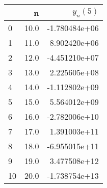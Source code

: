 \begin{tabular}{lrr}
\toprule
{} &     n &      $y_n(5)$ \\
\midrule
0  &  10.0 & -1.780484e+06 \\
1  &  11.0 &  8.902420e+06 \\
2  &  12.0 & -4.451210e+07 \\
3  &  13.0 &  2.225605e+08 \\
4  &  14.0 & -1.112802e+09 \\
5  &  15.0 &  5.564012e+09 \\
6  &  16.0 & -2.782006e+10 \\
7  &  17.0 &  1.391003e+11 \\
8  &  18.0 & -6.955015e+11 \\
9  &  19.0 &  3.477508e+12 \\
10 &  20.0 & -1.738754e+13 \\
\bottomrule
\end{tabular}
